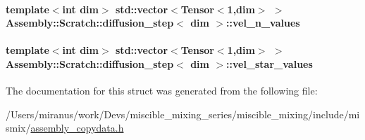 \paragraph[{vel\+\_\+n\+\_\+values}]{\setlength{\rightskip}{0pt plus 5cm}template$<$int dim$>$ std\+::vector$<$Tensor$<$1,dim$>$ $>$ {\bf Assembly\+::\+Scratch\+::diffusion\+\_\+step}$<$ dim $>$\+::vel\+\_\+n\+\_\+values}\label{struct_assembly_1_1_scratch_1_1diffusion__step_a3c69fd1c796447267c5e60b4574b7cd6}
\hypertarget{struct_assembly_1_1_scratch_1_1diffusion__step_a94cf958bf7072a08e34291f3b50f2a51}{}
\paragraph[{vel\+\_\+star\+\_\+values}]{\setlength{\rightskip}{0pt plus 5cm}template$<$int dim$>$ std\+::vector$<$Tensor$<$1,dim$>$ $>$ {\bf Assembly\+::\+Scratch\+::diffusion\+\_\+step}$<$ dim $>$\+::vel\+\_\+star\+\_\+values}\label{struct_assembly_1_1_scratch_1_1diffusion__step_a94cf958bf7072a08e34291f3b50f2a51}


The documentation for this struct was generated from the following file\+:\begin{DoxyCompactItemize}
\item 
/\+Users/miranus/work/\+Devs/miscible\+\_\+mixing\+\_\+series/miscible\+\_\+mixing/include/mismix/\hyperlink{assembly__copydata_8h}{assembly\+\_\+copydata.\+h}\end{DoxyCompactItemize}

